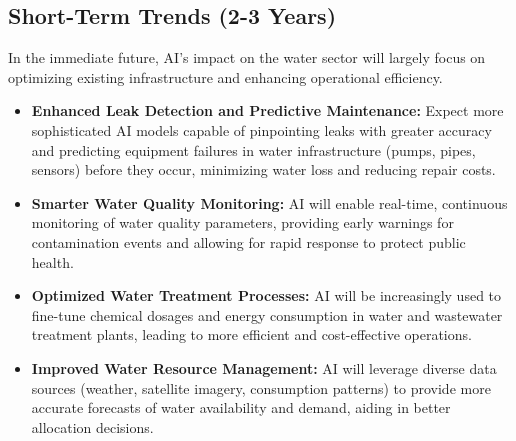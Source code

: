\subsection{Short-Term Trends (2-3 Years)}
In the immediate future, AI's impact on the water sector will largely focus on optimizing existing infrastructure and enhancing operational efficiency.
\begin{itemize}
    \item \textbf{Enhanced Leak Detection and Predictive Maintenance:} Expect more sophisticated AI models capable of pinpointing leaks with greater accuracy and predicting equipment failures in water infrastructure (pumps, pipes, sensors) before they occur, minimizing water loss and reducing repair costs.
    \item \textbf{Smarter Water Quality Monitoring:} AI will enable real-time, continuous monitoring of water quality parameters, providing early warnings for contamination events and allowing for rapid response to protect public health.
    \item \textbf{Optimized Water Treatment Processes:} AI will be increasingly used to fine-tune chemical dosages and energy consumption in water and wastewater treatment plants, leading to more efficient and cost-effective operations.
    \item \textbf{Improved Water Resource Management:} AI will leverage diverse data sources (weather, satellite imagery, consumption patterns) to provide more accurate forecasts of water availability and demand, aiding in better allocation decisions.
\end{itemize}

